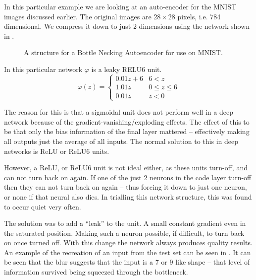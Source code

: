 \documentclass[12pt,parskip]{komatufte}
\begin{document}
In this particular example we are looking at an auto-encoder for the MNIST images discussed earlier.
The original images are $28 \times 28$ pixels, i.e. 784 dimensional.
We compress it down to just 2 dimensions using the network shown in .

\begin{figure}
	\caption{A structure for a Bottle Necking Autoencoder for use on MNIST.}
	\label{fig-autoencoder}
	\resizebox{\textwidth}{!}{}
\end{figure}


In this particular network $\varphi$ is a leaky RELU6 unit.
\begin{equation}
\varphi(z)=\begin{cases}
    0.01z+6 & 6<z \\
	1.01z & 0 \le z \le 6 \\
	0.01z & z < 0
\end{cases}
\end{equation}

The reason for this is that a sigmoidal unit does not perform well in a deep network because of the gradient-vanishing/exploding effects.
The effect of this to be that only the bias information of the final layer mattered -- effectively making all outputs just the average of all inputs.
The normal solution to this in deep networks is ReLU or ReLU6 units.

However, a ReLU, or ReLU6 unit is not ideal either,
as these units turn-off, and can not turn back on again.
If one of the just 2 neurons in the code layer turn-off then they can not turn back on again -- thus forcing it down to just one neuron, or none if that neural also dies.
In trialling this network structure, this was found to occur quiet very often.

The solution was to add a ``leak'' to the unit.
A small constant gradient even in the saturated position.
Making such a neuron possible, if difficult, to turn back on once turned off.
With this change the network always produces quality results.
An example of the recreation of an input from the test set can be seen in 
 . 
It can be seen that the blur suggests that the input is a 7 or 9 like shape -- that level of information survived being squeezed through the bottleneck.
\end{document}

